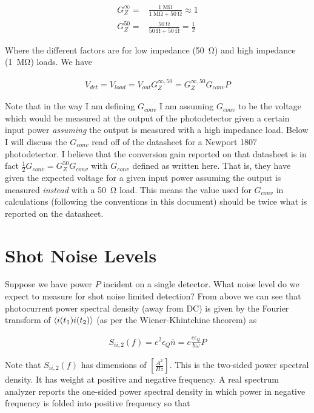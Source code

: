 \documentclass[12pt]{article}
\newcommand{\ep}{\epsilon}
\begin{document}
\begin{align}
G_Z^{\infty} =& \frac{\SI{1}{\mega \ohm}}{\SI{1}{\mega \ohm} + \SI{50}{\ohm}} \approx 1\\
G_Z^{50} =& \frac{\SI{50}{\ohm}}{\SI{50}{\ohm} + \SI{50}{\ohm}} = \frac{1}{2}
\end{align}

Where the different factors are for low impedance (\SI{50}{\ohm}) and high impedance (\SI{1}{\mega \ohm}) loads.
We have

\begin{align}
V_{det} = V_{load} = V_{out} G_Z^{\infty, 50} = G_Z^{\infty,50}G_{conv}P
\end{align}

Note that in the way I am defining $G_{conv}$ I am assuming $G_{conv}$ to be the voltage which would be measured at the output of the photodetector given a certain input power \textit{assuming} the output is measured with a high impedance load.
Below I will discuss the $G_{conv}$ read off of the datasheet for a Newport 1807 photodetector.
I believe that the conversion gain reported on that datasheet is in fact $\frac{1}{2} G_{conv} = G_Z^{50}G_{conv}$ with $G_{conv}$ defined as written here.
That is, they have given the expected voltage for a given input power assuming the output is measured \textit{instead} with a \SI{50}{\ohm} load.
This means the value used for $G_{conv}$ in calculations (following the conventions in this document) should be twice what is reported on the datasheet.

\section{Shot Noise Levels}

Suppose we have power $P$ incident on a single detector.
What noise level do we expect to measure for shot noise limited detection?
From above we can see that photocurrent power spectral density (away from DC) is given by the Fourier transform of $\Braket{i(t_1)i(t_2)}$ (as per the Wiener-Khintchine theorem) as

\begin{align}
S_{ii,2}(f) = e^2\ep_Q \bar{n} = e \frac{e\ep_Q}{\hbar \omega} P
\end{align}

Note that $S_{ii,2}(f)$ has dimensions of $\left[\frac{A^2}{Hz}\right]$.
This is the two-sided power spectral density.
It has weight at positive and negative frequency.
A real spectrum analyzer reports the one-sided power spectral density in which power in negative frequency is folded into positive frequency so that
\end{document}
